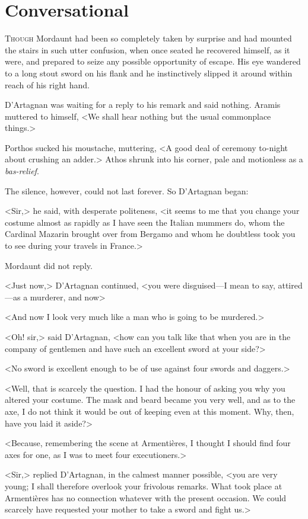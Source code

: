 \chapter{Conversational}

 \lettrine{T}{hough} Mordaunt had been so completely taken by surprise and had mounted the stairs in such utter confusion, when once seated he recovered himself, as it were, and prepared to seize any possible opportunity of escape. His eye wandered to a long stout sword on his flank and he instinctively slipped it around within reach of his right hand.

D'Artagnan was waiting for a reply to his remark and said nothing. Aramis muttered to himself, <We shall hear nothing but the usual commonplace things.>

Porthos sucked his moustache, muttering, <A good deal of ceremony to-night about crushing an adder.> Athos shrunk into his corner, pale and motionless as a \textit{bas-relief}.

The silence, however, could not last forever. So D'Artagnan began:

<Sir,> he said, with desperate politeness, <it seems to me that you change your costume almost as rapidly as I have seen the Italian mummers do, whom the Cardinal Mazarin brought over from Bergamo and whom he doubtless took you to see during your travels in France.>

Mordaunt did not reply.

<Just now,> D'Artagnan continued, <you were disguised—I mean to say, attired—as a murderer, and now\longdash>

<And now I look very much like a man who is going to be murdered.>

<Oh! sir,> said D'Artagnan, <how can you talk like that when you are in the company of gentlemen and have such an excellent sword at your side?>

<No sword is excellent enough to be of use against four swords and daggers.>

<Well, that is scarcely the question. I had the honour of asking you why you altered your costume. The mask and beard became you very well, and as to the axe, I do not think it would be out of keeping even at this moment. Why, then, have you laid it aside?>

<Because, remembering the scene at Armentières, I thought I should find four axes for one, as I was to meet four executioners.>

<Sir,> replied D'Artagnan, in the calmest manner possible, <you are very young; I shall therefore overlook your frivolous remarks. What took place at Armentières has no connection whatever with the present occasion. We could scarcely have requested your mother to take a sword and fight us.>

